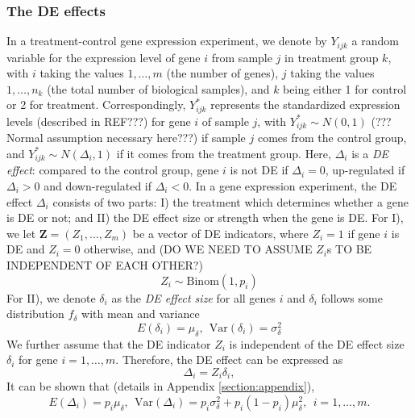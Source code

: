 \documentclass[useAMS,usenatbib, galley]{biom}
\begin{document}
	\subsubsection*{The DE effects}\label{subsection:DEeffect}
	
	In a treatment-control gene expression experiment, we denote by $Y_{ijk}$ a random variable for the expression level of gene $i$ from sample $j$ in treatment group $k$, with $i$ taking the values $1, \ldots, m$ (the number of genes), $j$ taking the values $1, \ldots, n_k$ (the total number of biological samples), and $k$ being either 1 for control or 2 for treatment. Correspondingly, $Y^{\ast}_{ijk}$ represents the standardized expression levels (described in REF???) for gene $i$ of sample $j$, with $Y^{\ast}_{ijk}\sim N(0, 1)$ (??? Normal assumption necessary here???)  if sample $j$ comes from the control group, and $Y^{\ast}_{ijk}\sim N(\Delta_i, 1)$ if it comes from the treatment group. Here, $\Delta_i$ is a \textit{DE effect}: compared to the control group,  gene $i$ is not DE if $\Delta_i=0$, up-regulated if $\Delta_i >0 $ and down-regulated if $\Delta_i<0$.
	In a gene expression experiment, the DE effect $\Delta_i$ consists of two parts: I) the treatment which determines whether a gene is DE or not; and II) the DE effect size or strength when the gene is DE. 
	For I), we let $\bm Z = (Z_1, \ldots, Z_m)$ be a vector of DE indicators, where $Z_i=1$ if gene $i$ is DE and $Z_i = 0$ otherwise, and (DO WE NEED TO ASSUME $Z_i$s TO BE INDEPENDENT OF EACH OTHER?)
	\begin{equation}\label{eq:DEindicator}
	Z_i \sim \text{Binom}(1, p_i)
	\end{equation}
	For II), we denote $\delta_i$ as the \textit{DE effect size} for all genes $i$ and $\delta_i$ follows some distribution $ f_{\delta}$ with mean and variance
	\begin{equation}\label{eq:DEdistribution}
	E(\delta_i) = \mu_{\delta}, ~~\text{Var}(\delta_i) = \sigma^2_{\delta}
	\end{equation}
	We further assume that the DE indicator $Z_i$ is independent of the DE effect size $\delta_i$ for gene $i=1, \ldots, m$.  Therefore, the DE effect can be expressed as
	\begin{equation}\label{eq:DEeffect}
	\Delta_i = Z_i\delta_i,
	\end{equation}
	It can be shown that (details in Appendix \ref{section:appendix}), 
	\begin{equation}\label{eq:deltaMeanVar}
	E(\Delta_i) = p_i\mu_{\delta}, ~~  \text{Var}(\Delta_i)= p_i\sigma_{\delta}^2 + p_i(1-p_i)\mu_{\delta}^2, ~~i = 1, \ldots, m.
	\end{equation}
	
\end{document}
